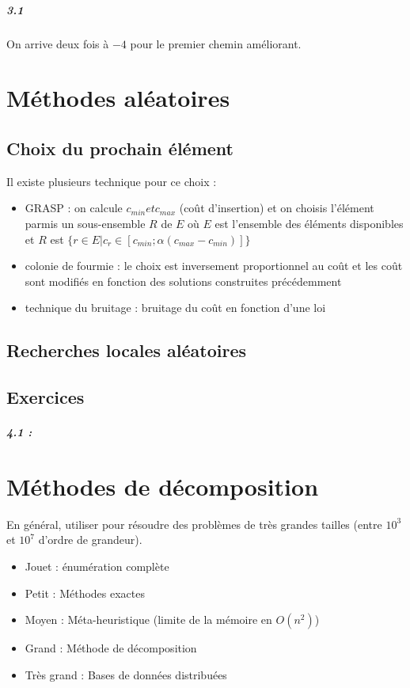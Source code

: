 \documentclass[11pt,a4paper]{report}
\begin{document}
\paragraph*{3.1} On arrive deux fois à $-4$ pour le premier chemin améliorant.

\chapter{Méthodes aléatoires}

\section{Choix du prochain élément}

Il existe plusieurs technique pour ce choix :
\begin{itemize}
    \item GRASP : on calcule $c_{min} et c_{max}$ (coût d'insertion) et on choisis l'élément parmis un sous-ensemble $R$ de $E$ où $E$ est l'ensemble des éléments disponibles et $R$ est $\{r \in E | c_{r} \in [c_{min};\alpha(c_{max}-c_{min})]\}$
    \item colonie de fourmie : le choix est inversement proportionnel au coût et les coût sont modifiés en fonction des solutions construites précédemment
    \item technique du bruitage : bruitage du coût en fonction d'une loi
\end{itemize}

\section{Recherches locales aléatoires}

\section{Exercices}

\paragraph*{4.1 : }

\chapter{Méthodes de décomposition}

En général, utiliser pour résoudre des problèmes de très grandes tailles (entre $10^3$ et $10^7$ d'ordre de grandeur).
\begin{itemize}
    \item Jouet : énumération complète
    \item Petit : Méthodes exactes
    \item Moyen : Méta-heuristique (limite de la mémoire en $O(n^2)$)
    \item Grand : Méthode de décomposition
    \item Très grand : Bases de données distribuées
\end{itemize}
\end{document}

